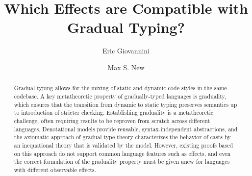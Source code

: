\documentclass[acmsmall,screen,review,anonymous]{acmart}
\theoremstyle{remark}
\newif\ifdraft
\renewcommand{\max}[1]{\ifdraft{\color{blue}[{\bf Max says}: #1]}\fi}
\begin{document}
\title{Which Effects are Compatible with Gradual Typing?}
\author{Eric Giovannini}


\author{Max S. New}

\begin{abstract}
    Gradual typing allows for the mixing of static and dynamic code styles in
    the same codebase. A key metatheoretic property of gradually-typed languages
    is graduality, which ensures that the transition from dynamic to static
    typing preserves semantics up to introduction of stricter checking.
    Establishing graduality is a metatheoretic challenge, often requiring
    results to be reproven from scratch across different languages. Denotational
    models provide reusable, syntax-independent abstractions, and the axiomatic
    approach of gradual type theory characterizes the behavior of casts by an
    inequational theory that is validated by the model.
    However, existing proofs based on this approach do not support common
    language features such as effects, and even the correct formulation of the
    graduality property must be given anew for languages with different
    observable effects.
    


\end{abstract}
\end{document}
